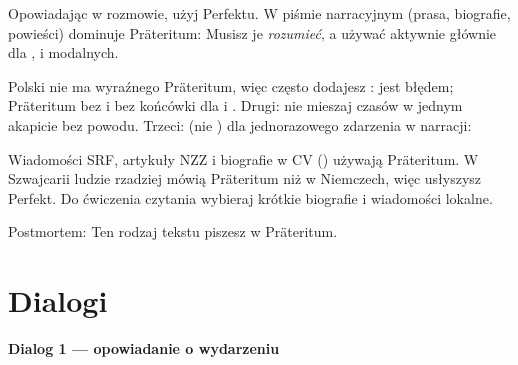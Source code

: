 \begin{zasada}
Opowiadając w rozmowie, użyj Perfektu. W piśmie narracyjnym (prasa, biografie, powieści) dominuje Präteritum:  Musisz je \emph{rozumieć}, a używać aktywnie głównie dla
,  i modalnych.
\end{zasada}

\begin{falle}
Polski nie ma wyraźnego Präteritum, więc często dodajesz :  jest błędem; Präteritum  bez
 i bez końcówki dla  i . Drugi: nie mieszaj czasów w jednym akapicie bez powodu. Trzeci:  (nie )
dla jednorazowego zdarzenia w narracji: 
\end{falle}

\begin{szwajcaria}
Wiadomości SRF, artykuły NZZ i biografie w CV () używają Präteritum. W Szwajcarii ludzie
rzadziej mówią Präteritum niż w Niemczech, więc usłyszysz Perfekt. Do ćwiczenia czytania wybieraj krótkie biografie i wiadomości
lokalne.
\end{szwajcaria}

\begin{praca}
Postmortem:  Ten rodzaj tekstu piszesz w Präteritum.
\end{praca}

\section{Dialogi}
\textbf{Dialog 1 --- opowiadanie o wydarzeniu}
\begin{dialog}
\end{dialog}

